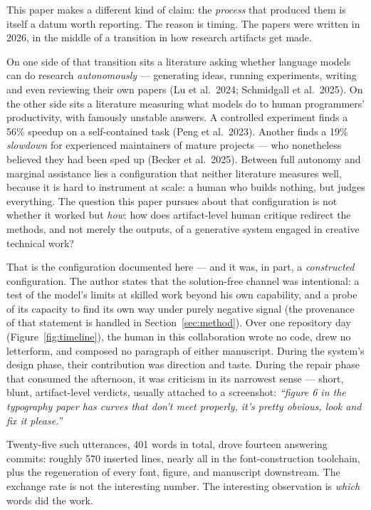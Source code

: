 \documentclass[11pt]{article}
\begin{document}
This paper makes a different kind of claim: the \emph{process} that produced them is itself a datum worth reporting. The reason is timing. The papers were written in 2026, in the middle of a transition in how research artifacts get made.

On one side of that transition sits a literature asking whether language models can do research \emph{autonomously} — generating ideas, running experiments, writing and even reviewing their own papers (Lu et al.\ 2024; Schmidgall et al.\ 2025). On the other side sits a literature measuring what models do to human programmers' productivity, with famously unstable answers. A controlled experiment finds a 56\% speedup on a self-contained task (Peng et al.\ 2023). Another finds a 19\% \emph{slowdown} for experienced maintainers of mature projects — who nonetheless believed they had been sped up (Becker et al.\ 2025). Between full autonomy and marginal assistance lies a configuration that neither literature measures well, because it is hard to instrument at scale: a human who builds nothing, but judges everything. The question this paper pursues about that configuration is not whether it worked but \emph{how}: how does artifact-level human critique redirect the methods, and not merely the outputs, of a generative system engaged in creative technical work?

That is the configuration documented here — and it was, in part, a \emph{constructed} configuration. The author states that the solution-free channel was intentional: a test of the model's limits at skilled work beyond his own capability, and a probe of its capacity to find its own way under purely negative signal (the provenance of that statement is handled in Section~\ref{sec:method}). Over one repository day (Figure~\ref{fig:timeline}), the human in this collaboration wrote no code, drew no letterform, and composed no paragraph of either manuscript. During the system's design phase, their contribution was direction and taste. During the repair phase that consumed the afternoon, it was criticism in its narrowest sense — short, blunt, artifact-level verdicts, usually attached to a screenshot: \emph{``figure 6 in the typography paper has curves that don't meet properly, it's pretty obvious, look and fix it please.''}

Twenty-five such utterances, 401 words in total, drove fourteen answering commits: roughly 570 inserted lines, nearly all in the font-construction toolchain, plus the regeneration of every font, figure, and manuscript downstream. The exchange rate is not the interesting number. The interesting observation is \emph{which} words did the work.
\end{document}
